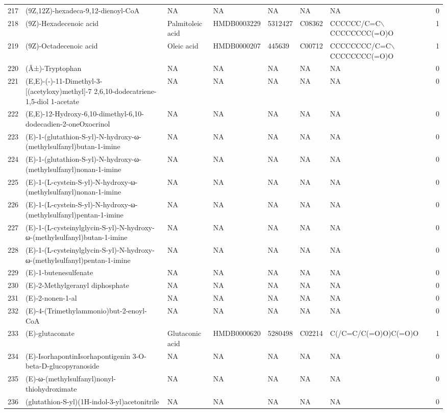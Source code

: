 \documentclass[a4paper]{article}
\begin{document}
\begin{longtable}{rlllllll}
  217 & (9Z,12Z)-hexadeca-9,12-dienoyl-CoA & NA & NA & NA & NA & NA & 0 \\ 
  218 & (9Z)-Hexadecenoic acid & Palmitoleic acid & HMDB0003229 & 5312427 & C08362 & CCCCCC/C=C$\backslash$CCCCCCCC(=O)O & 1 \\ 
  219 & (9Z)-Octadecenoic acid & Oleic acid & HMDB0000207 & 445639 & C00712 & CCCCCCCC/C=C$\backslash$CCCCCCCC(=O)O & 1 \\ 
  220 & (Â±)-Tryptophan & NA & NA & NA & NA & NA & 0 \\ 
  221 & (E,E)-(-)-11-Dimethyl-3-[(acetyloxy)methyl]-7 2,6,10-dodecatriene-1,5-diol 1-acetate & NA & NA & NA & NA & NA & 0 \\ 
  222 & (E,E)-12-Hydroxy-6,10-dimethyl-6,10-dodecadien-2-oneOxocrinol & NA & NA & NA & NA & NA & 0 \\ 
  223 & (E)-1-(glutathion-S-yl)-N-hydroxy-ω-(methylsulfanyl)butan-1-imine & NA & NA & NA & NA & NA & 0 \\ 
  224 & (E)-1-(glutathion-S-yl)-N-hydroxy-ω-(methylsulfanyl)nonan-1-imine & NA & NA & NA & NA & NA & 0 \\ 
  225 & (E)-1-(L-cystein-S-yl)-N-hydroxy-ω-(methylsulfanyl)nonan-1-imine & NA & NA & NA & NA & NA & 0 \\ 
  226 & (E)-1-(L-cystein-S-yl)-N-hydroxy-ω-(methylsulfanyl)pentan-1-imine & NA & NA & NA & NA & NA & 0 \\ 
  227 & (E)-1-(L-cysteinylglycin-S-yl)-N-hydroxy-ω-(methylsulfanyl)butan-1-imine & NA & NA & NA & NA & NA & 0 \\ 
  228 & (E)-1-(L-cysteinylglycin-S-yl)-N-hydroxy-ω-(methylsulfanyl)pentan-1-imine & NA & NA & NA & NA & NA & 0 \\ 
  229 & (E)-1-butenesulfenate & NA & NA & NA & NA & NA & 0 \\ 
  230 & (E)-2-Methylgeranyl diphosphate & NA & NA & NA & NA & NA & 0 \\ 
  231 & (E)-2-nonen-1-al & NA & NA & NA & NA & NA & 0 \\ 
  232 & (E)-4-(Trimethylammonio)but-2-enoyl-CoA & NA & NA & NA & NA & NA & 0 \\ 
  233 & (E)-glutaconate & Glutaconic acid & HMDB0000620 & 5280498 & C02214 & C(/C=C/C(=O)O)C(=O)O & 1 \\ 
  234 & (E)-IsorhapontinIsorhapontigenin 3-O-beta-D-glucopyranoside & NA & NA & NA & NA & NA & 0 \\ 
  235 & (E)-ω-(methylsulfanyl)nonyl-thiohydroximate & NA & NA & NA & NA & NA & 0 \\ 
  236 & (glutathion-S-yl)(1H-indol-3-yl)acetonitrile & NA & NA & NA & NA & NA & 0 \\ 

\end{longtable}
\end{document}
